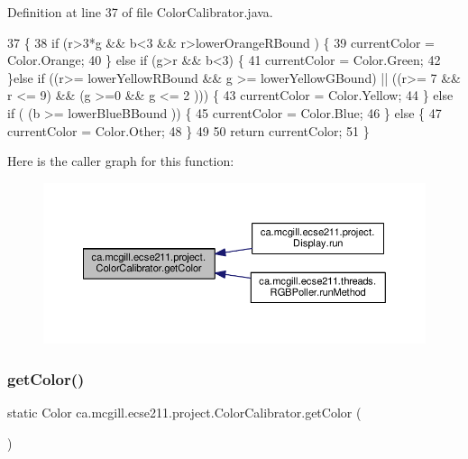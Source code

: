 Definition at line 37 of file Color\+Calibrator.\+java.


\begin{DoxyCode}
37                                                     \{
38     \textcolor{keywordflow}{if} (r>3*g && b<3 && r>lowerOrangeRBound ) \{
39       currentColor = Color.Orange;
40     \} \textcolor{keywordflow}{else} \textcolor{keywordflow}{if} (g>r && b<3) \{
41       currentColor = Color.Green;
42       \}\textcolor{keywordflow}{else} \textcolor{keywordflow}{if} ((r>= lowerYellowRBound && g >= lowerYellowGBound) || ((r>= 7 && r <= 9) && (g >=0 && g <= 2
      ))) \{
43       currentColor = Color.Yellow;
44     \} \textcolor{keywordflow}{else} \textcolor{keywordflow}{if} ( (b >= lowerBlueBBound )) \{
45       currentColor = Color.Blue;
46     \} \textcolor{keywordflow}{else} \{
47       currentColor = Color.Other;
48     \}
49 
50     \textcolor{keywordflow}{return} currentColor;
51   \}
\end{DoxyCode}
Here is the caller graph for this function\+:\nopagebreak
\begin{figure}[H]
\begin{center}
\leavevmode
\includegraphics[width=350pt]{classca_1_1mcgill_1_1ecse211_1_1project_1_1_color_calibrator_a92e653a6a9f7a31cb7b6f9bc2e732133_icgraph}
\end{center}
\end{figure}
\mbox{\label{classca_1_1mcgill_1_1ecse211_1_1project_1_1_color_calibrator_a1acf05f9523b2c0f329d4a7cbf1b9c47}} 
\subsubsection{\texorpdfstring{get\+Color()}{getColor()}\hspace{0.1cm}{\footnotesize\ttfamily [2/2]}}
{\footnotesize\ttfamily static Color ca.\+mcgill.\+ecse211.\+project.\+Color\+Calibrator.\+get\+Color (\begin{DoxyParamCaption}{ }\end{DoxyParamCaption})\hspace{0.3cm}{\ttfamily [static]}}

